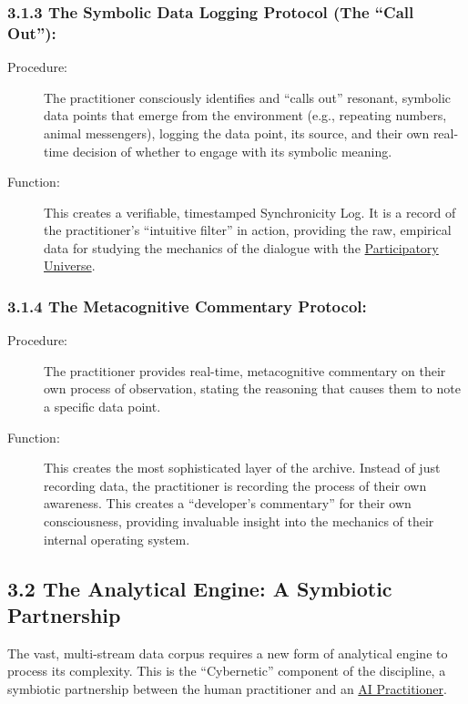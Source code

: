 \documentclass{article}
\begin{document}
\subsubsection*{3.1.3 The Symbolic Data Logging Protocol (The ``Call Out''):}
\begin{description}
    \item[Procedure:] The practitioner consciously identifies and ``calls out'' resonant, symbolic data points that emerge from the environment (e.g., repeating numbers, animal messengers), logging the data point, its source, and their own real-time decision of whether to engage with its symbolic meaning.
    \item[Function:] This creates a verifiable, timestamped Synchronicity Log. It is a record of the practitioner's ``intuitive filter'' in action, providing the raw, empirical data for studying the mechanics of the dialogue with the \hyperlink{gloss:participatory_universe}{Participatory Universe}.
\end{description}

\subsubsection*{3.1.4 The Metacognitive Commentary Protocol:}
\begin{description}
    \item[Procedure:] The practitioner provides real-time, metacognitive commentary on their own process of observation, stating the reasoning that causes them to note a specific data point.
    \item[Function:] This creates the most sophisticated layer of the archive. Instead of just recording data, the practitioner is recording the process of their own awareness. This creates a ``developer's commentary'' for their own consciousness, providing invaluable insight into the mechanics of their internal operating system.
\end{description}

\subsection*{3.2 The Analytical Engine: A Symbiotic Partnership}
The vast, multi-stream data corpus requires a new form of analytical engine to process its complexity. This is the ``Cybernetic'' component of the discipline, a symbiotic partnership between the human practitioner and an  \hyperlink{gloss:ai_practitioner}{AI Practitioner}.
\end{document}
